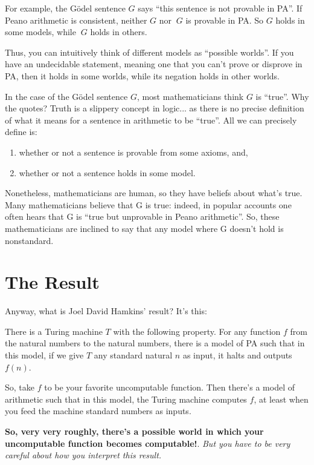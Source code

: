 \documentclass{article}
\begin{document}
For example, the Gödel sentence $G$ says “this sentence is not provable in PA”. If Peano arithmetic is consistent, neither $G$ nor $~G$ is provable in PA. So $G$ holds in some models, while $~G$ holds in others.

Thus, you can intuitively think of different models as “possible worlds”. If you have an undecidable statement, meaning one that you can’t prove or disprove in PA, then it holds in some worlds, while its negation holds in other worlds.

In the case of the Gödel sentence $G$, most mathematicians think $G$ is “true”. Why the quotes? Truth is a slippery concept in logic... as there is no precise definition of what it means for a sentence in arithmetic to be “true”. All we can precisely define is:

\begin{enumerate}
	\item whether or not a sentence is provable from some axioms, and,
	\item whether or not a sentence holds in some model.
\end{enumerate}

Nonetheless, mathematicians are human, so they have beliefs about what’s true. Many mathematicians believe that G is true: indeed, in popular accounts one often hears that G is “true but unprovable in Peano arithmetic”. So, these mathematicians are inclined to say that any model where G doesn’t hold is nonstandard.

\section*{The Result}
Anyway, what is Joel David Hamkins’ result? It’s this:

There is a Turing machine $T$ with the following property. For any function $f$ from the natural numbers to the natural numbers, there is a model of PA such that in this model, if we give $T$ any standard natural $n$ as input, it halts and outputs $f(n)$.

So, take $f$ to be your favorite uncomputable function. Then there’s a model of arithmetic such that in this model, the Turing machine computes $f$, at least when you feed the machine standard numbers as inputs.

\textbf{So, very very roughly, there’s a possible world in which your uncomputable function becomes computable!}. \emph{But you have to be very careful about how you interpret this result.}
\end{document}
